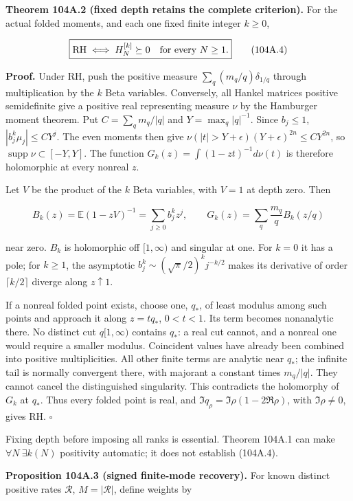 \documentclass[
  11pt,
]{book}
\begin{document}
\textbf{Theorem 104A.2 (fixed depth retains the complete criterion).}
For the actual folded moments, and each one fixed finite integer
\(k\ge0\),

\[
\boxed{\mathrm{RH}\iff H_N^{[k]}\succeq0\quad\hbox{for every }N\ge1.}
\tag{104A.4}
\]

\textbf{Proof.} Under RH, push the positive measure
\(\sum_q(m_q/q)\delta_{1/q}\) through multiplication by the \(k\) Beta
variables. Conversely, all Hankel matrices positive semidefinite give a
positive real representing measure \(\nu\) by the Hamburger moment
theorem. Put \(C=\sum_qm_q/|q|\) and \(Y=\max_q|q|^{-1}\). Since
\(b_j\le1\), \(|b_j^k\mu_j|\le CY^j\). The even moments then give
\(\nu(|t|>Y+\epsilon)(Y+\epsilon)^{2n}\le CY^{2n}\), so
\(\operatorname{supp}\nu\subset[-Y,Y]\). The function
\(G_k(z)=\int(1-zt)^{-1}d\nu(t)\) is therefore holomorphic at every
nonreal \(z\).

Let \(V\) be the product of the \(k\) Beta variables, with \(V=1\) at
depth zero. Then

\[
B_k(z)=\mathbb E(1-zV)^{-1}=\sum_{j\ge0}b_j^kz^j,
\qquad G_k(z)=\sum_q\frac{m_q}{q}B_k(z/q)
\tag{104A.5}
\]

near zero. \(B_k\) is holomorphic off \([1,\infty)\) and singular at
one. For \(k=0\) it has a pole; for \(k\ge1\), the asymptotic
\(b_j^k\sim(\sqrt\pi/2)^kj^{-k/2}\) makes its derivative of order
\(\lceil k/2\rceil\) diverge along \(z\uparrow1\).

If a nonreal folded point exists, choose one, \(q_*\), of least modulus
among such points and approach it along \(z=tq_*\), \(0<t<1\). Its term
becomes nonanalytic there. No distinct cut \(q[1,\infty)\) contains
\(q_*\): a real cut cannot, and a nonreal one would require a smaller
modulus. Coincident values have already been combined into positive
multiplicities. All other finite terms are analytic near \(q_*\); the
infinite tail is normally convergent there, with majorant a constant
times \(m_q/|q|\). They cannot cancel the distinguished singularity.
This contradicts the holomorphy of \(G_k\) at \(q_*\). Thus every folded
point is real, and \(\Im q_\rho=\Im\rho(1-2\Re\rho)\), with
\(\Im\rho\ne0\), gives RH. \(\square\)

Fixing depth before imposing all ranks is essential. Theorem 104A.1 can
make \(\forall N\ \exists k(N)\) positivity automatic; it does not
establish (104A.4).

\textbf{Proposition 104A.3 (signed finite-mode recovery).} For known
distinct positive rates \(\mathcal R\), \(M=|\mathcal R|\), define
weights by
\end{document}
